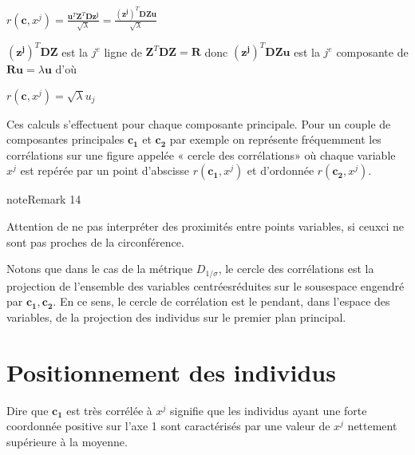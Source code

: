 \documentclass[letterpaper,10pt,english]{jupyterBook}
\begin{document}
\sphinxAtStartPar
\(r(\mathbf{c},x^j)=\frac{\mathbf{u}^T\mathbf Z^T\mathbf D\mathbf{z^j}}{\sqrt{\lambda}}=\frac{(\mathbf{z^j})^T\mathbf D\mathbf Z\mathbf{u}}{\sqrt{\lambda}}\)

\sphinxAtStartPar
\((\mathbf{z^j})^T\mathbf D\mathbf Z\) est la \(j^e\) ligne de \(\mathbf Z^T\mathbf D\mathbf Z=\mathbf R\) donc \((\mathbf{z^j})^T\mathbf D \mathbf Z \mathbf{u}\) est la \(j^e\) composante de \(\mathbf R\mathbf{u}=\lambda \mathbf{u}\) d’où

\sphinxAtStartPar
\(r(\mathbf{c},x^j)=\sqrt{\lambda}u_j\)

\sphinxAtStartPar
Ces calculs s’effectuent pour chaque composante principale. Pour un couple de composantes principales \(\mathbf{c_1}\) et \(\mathbf{c_2}\) par exemple on représente fréquemment les corrélations sur une figure appelée « cercle des corrélations» où chaque variable \(x^j\) est repérée par un point d’abscisse \(r(\mathbf{c_1},x^j)\) et d’ordonnée \(r(\mathbf{c_2},x^j)\).

\sphinxAtStartPar
{}
\label{acp:remark-2}
\begin{sphinxadmonition}{note}{Remark 14}



\sphinxAtStartPar
Attention de ne pas interpréter des proximités entre points variables, si ceux\sphinxhyphen{}ci ne sont pas proches de la circonférence.
\end{sphinxadmonition}

\sphinxAtStartPar
Notons que dans le cas de la métrique \(D_{1/\sigma}\), le cercle des corrélations est la projection de l’ensemble des variables centrées\sphinxhyphen{}réduites sur le sous\sphinxhyphen{}espace engendré par \(\mathbf{c_1},\mathbf{c_2}\). En ce sens, le cercle de corrélation est le pendant, dans l’espace des variables, de la projection des individus sur le premier plan principal.


\section{Positionnement des individus}
\label{\detokenize{acp:positionnement-des-individus}}
\sphinxAtStartPar
Dire que \(\mathbf{c_1}\) est très corrélée à \(x^j\) signifie que les individus ayant une forte coordonnée positive sur l’axe 1 sont caractérisés par une valeur de \(x^j\) nettement supérieure à la moyenne.
\end{document}

